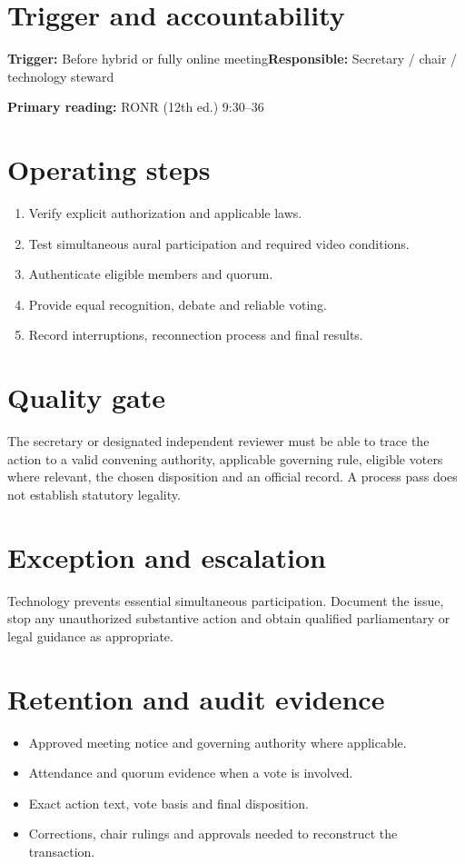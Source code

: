 \documentclass[11pt]{article}
\begin{document}
\SuiteOpen
{}
\section{Trigger and accountability}
\textbf{Trigger:} Before hybrid or fully online meeting\quad\textbf{Responsible:} Secretary / chair / technology steward

\textbf{Primary reading:} RONR (12th ed.) 9:30--36

\section{Operating steps}
\begin{enumerate}[leftmargin=*,itemsep=4pt]
\item Verify explicit authorization and applicable laws.
\item Test simultaneous aural participation and required video conditions.
\item Authenticate eligible members and quorum.
\item Provide equal recognition, debate and reliable voting.
\item Record interruptions, reconnection process and final results.
\end{enumerate}

\section{Quality gate}
The secretary or designated independent reviewer must be able to trace the action to a valid convening authority, applicable governing rule, eligible voters where relevant, the chosen disposition and an official record. A process pass does not establish statutory legality.

\section{Exception and escalation}
Technology prevents essential simultaneous participation. Document the issue, stop any unauthorized substantive action and obtain qualified parliamentary or legal guidance as appropriate.

\section{Retention and audit evidence}
\begin{itemize}[leftmargin=*,itemsep=4pt]
\item Approved meeting notice and governing authority where applicable.
\item Attendance and quorum evidence when a vote is involved.
\item Exact action text, vote basis and final disposition.
\item Corrections, chair rulings and approvals needed to reconstruct the transaction.
\end{itemize}
\end{document}
